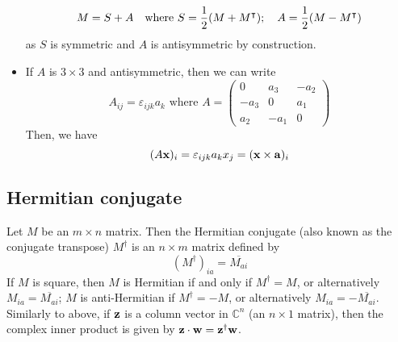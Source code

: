 \begin{itemize}
	      \[
		      M = S + A\quad\text{where } S = \frac{1}{2}(M + M^\intercal);\quad A = \frac{1}{2}(M - M^\intercal)
	      \]
	      as \(S\) is symmetric and \(A\) is antisymmetric by construction.
	\item If \(A\) is \(3 \times 3\) and antisymmetric, then we can write
	      \[
		      A_{ij} = \varepsilon_{ijk}a_k\text{ where } A = \begin{pmatrix}
			      0    & a_3  & -a_2 \\
			      -a_3 & 0    & a_1  \\
			      a_2  & -a_1 & 0
		      \end{pmatrix}
	      \]
	      Then, we have
	      \[
		      (A \vb x)_i = \varepsilon_{ijk}a_k x_j = (\vb x \times \vb a)_i
	      \]
\end{itemize}

\subsection{Hermitian conjugate}
Let \(M\) be an \(m \times n\) matrix.
Then the Hermitian conjugate (also known as the conjugate transpose) \(M^\dagger\) is an \(n \times m\) matrix defined by
\[
	(M^\dagger)_{ia} = \overline{M_{ai}}
\]
If \(M\) is square, then \(M\) is Hermitian if and only if \(M^\dagger = M\), or alternatively \(M_{ia} = \overline{M_{ai}}\); \(M\) is anti-Hermitian if \(M^\dagger = -M\), or alternatively \(M_{ia} = -\overline{M_{ai}}\).
Similarly to above, if \(\vb z\) is a column vector in \(\mathbb C^n\) (an \(n \times 1\) matrix), then the complex inner product is given by \(\vb z \cdot \vb w = \vb z^\dagger \vb w\).

